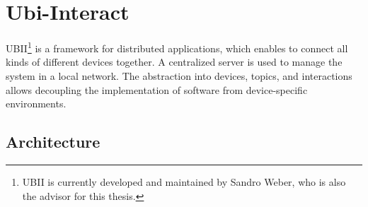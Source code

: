 \section{Ubi-Interact}\label{section:ubi-interact}
\setcounter{footnote}{0} %

\ac{UBII}\footnote{UBII is currently developed and maintained by Sandro Weber, who is also the advisor for this thesis.} is a framework for distributed applications, which enables to connect all kinds of different devices together. A centralized server is used to manage the system in a local network. The abstraction into devices, topics, and interactions allows decoupling  the implementation of software from device-specific environments.


\subsection{Architecture}\label{subsection:architecture}

